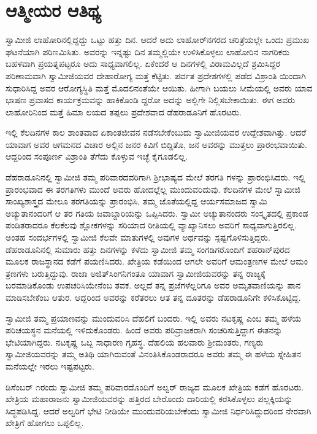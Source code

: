 
\chapter{ಆತ್ಮೀಯರ ಆತಿಥ್ಯ}

\noindent

ಸ್ವಾಮೀಜಿ ಲಾಹೋರಿನಲ್ಲಿದ್ದದ್ದು ಒಟ್ಟು ಹತ್ತು ದಿನ. ಆದರೆ ಅದು ಲಾಹೋರ್​ನಗರದ ಚರಿತ್ರೆಯಲ್ಲೇ ಒಂದು ಪ್ರಮುಖ ಘಟನೆಯಾಗಿ ಪರಿಣಮಿಸಿತು. ಅವರನ್ನು ಇನ್ನಷ್ಟು ದಿನ ತಮ್ಮಲ್ಲಿಯೇ ಉಳಿಸಿಕೊಳ್ಳಲು ಲಾಹೋರಿನ ನಾಗರಿಕರು ಬಹಳವಾಗಿ ಪ್ರಯತ್ನಪಟ್ಟರೂ ಅದು ಸಾಧ್ಯವಾಗಲಿಲ್ಲ. ಏಕೆಂದರೆ ಆ ದಿನಗಳಲ್ಲಿ ವಿರಾಮವಿಲ್ಲದೆ ಶ್ರಮಿಸಿದ್ದರ ಪರಿಣಾಮವಾಗಿ ಸ್ವಾಮೀಜಿಯವರ ದೇಹಾರೋಗ್ಯ ಮತ್ತೆ ಕೆಟ್ಟಿತು. ಪರ್ವತ ಪ್ರದೇಶಗಳಲ್ಲಿ ಪಡೆದ ವಿಶ್ರಾಂತಿ ಯಿಂದಾಗಿ ಸುಧಾರಿಸಿದ್ದ ಅವರ ಆರೋಗ್ಯಸ್ಥಿತಿ ಮತ್ತೆ ಮೊದಲಿನಂತೆಯೇ ಆಯಿತು. ಹೀಗಾಗಿ ಬಯಲು ಸೀಮೆಯಲ್ಲಿ ಅವರು ಯಾವ ಭಾಷಣ ಪ್ರವಾಸದ ಕಾರ್ಯಕ್ರಮವನ್ನು ಹಾಕಿಕೊಂಡಿ ದ್ದರೋ ಅದನ್ನು ಅಲ್ಲಿಗೇ ನಿಲ್ಲಿಸಬೇಕಾಯಿತು. ಈಗ ಅವರು ಲಾಹೋರಿನಿಂದ ಮತ್ತೆ ಹಿಮಾ ಲಯದ ತಪ್ಪಲು ಪ್ರದೇಶವಾದ ಡೆಹರಾಡೂನಿಗೆ ಹೊರಟರು.

ಇಲ್ಲಿ ಕೆಲದಿನಗಳ ಕಾಲ ಶಾಂತವಾದ ಏಕಾಂತಜೀವನ ನಡೆಸಬೇಕೆಂಬುದು ಸ್ವಾಮೀಜಿಯವರ ಉದ್ದೇಶವಾಗಿತ್ತು. ಆದರೆ ಯಾವಾಗ ಅವರ ಆಗಮನದ ವಿಚಾರ ಅಲ್ಲಿನ ಜನರ ಕಿವಿಗೆ ಬಿದ್ದಿತೊ, ಜನ ಅವರನ್ನು ಮುತ್ತಲು ಪ್ರಾರಂಭವಾಯಿತು. ಆದ್ದರಿಂದ ಸಂಪೂರ್ಣ ವಿಶ್ರಾಂತಿ ತೆಗೆದು ಕೊಳ್ಳುವ ಇಚ್ಛೆ ಕೈಗೂಡಲಿಲ್ಲ.

ಡೆಹರಾಡೂನಿನಲ್ಲಿ ಸ್ವಾಮೀಜಿ ತಮ್ಮ ಪರಿವಾರದವರಿಗಾಗಿ ಶ್ರೀಭಾಷ್ಯದ ಮೇಲೆ ತರಗತಿ ಗಳನ್ನು ಪ್ರಾರಂಭಿಸಿದರು. ಇಲ್ಲಿ ಪ್ರಾರಂಭವಾದ ಈ ತರಗತಿಗಳು ಮುಂದೆ ಅವರು ಹೋದಲ್ಲೆಲ್ಲ ಮುಂದುವರಿದುವು. ಕೆಲದಿನಗಳ ಮೇಲೆ ಸ್ವಾಮೀಜಿ ಸಾಂಖ್ಯಶಾಸ್ತ್ರದ ಮೇಲೂ ತರಗತಿಯನ್ನು ಪ್ರಾರಂಭಿಸಿ, ತಮ್ಮ ಜೊತೆಯಲ್ಲಿದ್ದ ಆರ್ಯಸಮಾಜದ ಸ್ವಾಮಿ ಅಚ್ಯುತಾನಂದರಿಗೆ ಆ ತರ ಗತಿಯ ಜವಾಬ್ದಾರಿಯನ್ನು ಒಪ್ಪಿಸಿದರು. ಸ್ವಾಮೀ ಅಚ್ಯುತಾನಂದರು ಸಂಸ್ಕೃತದಲ್ಲಿ ಪ್ರಕಾಂಡ ಪಂಡಿತರಾದರೂ ಕೆಲಕೆಲವು ಶ್ಲೋಕಗಳನ್ನು ಸರಿಯಾದ ರೀತಿಯಲ್ಲಿ ವ್ಯಾಖ್ಯಾನಿಸಲು ಅವರಿಗೆ ಸಾಧ್ಯವಾಗುತ್ತಿರಲಿಲ್ಲ. ಅಂತಹ ಸಂದರ್ಭಗಳಲ್ಲಿ ಸ್ವಾಮೀಜಿ ಕೆಲವೇ ಮಾತುಗಳಲ್ಲಿ ಅವುಗಳ ಅರ್ಥವನ್ನು ಸ್ಪಷ್ಟಗೊಳಿಸುತ್ತಿದ್ದರು. ಡೆಹರಾಡೂನಿನಲ್ಲಿ ಸುಮಾರು ಹತ್ತು ದಿನಗಳನ್ನು ಕಳೆದು ಸ್ವಾಮೀಜಿ ತಮ್ಮ ಸಂಗಡಿಗರೊಂದಿಗೆ ಶಹರಾನ್​ಪುರದ ಮೂಲಕ ರಾಜಸ್ಥಾನದ ಕಡೆಗೆ ಪಯಣಿಸಿದರು. ಖೇತ್ರಿಯ ಕಡೆಯಿಂದ ಆಗಲೇ ಅವರಿಗೆ ಆಮಂತ್ರಣಗಳ ಮೇಲೆ ಆಮಂ ತ್ರಣಗಳು ಬರುತ್ತಿದ್ದುವು. ರಾಜಾ ಅಜಿತ್​ಸಿಂಗನಿಗಂತೂ ಯಾವಾಗ ಸ್ವಾಮೀಜಿಯವರನ್ನು ತನ್ನ ರಾಜ್ಯಕ್ಕೆ ಬರಮಾಡಿಕೊಂಡು ಉಪಚರಿಸಿಯೇನೆಂಬ ತವಕ. ಅಲ್ಲದೆ ತನ್ನ ಪ್ರಜೆಗಳೆಲ್ಲರಿಗೂ ಅವರ ಅಮೃತವಾಣಿಯನ್ನು ಪಾನ ಮಾಡಿಸಬೇಕೆಂಬ ಆತುರ. ಆದ್ದರಿಂದ ಅವರನ್ನು ಕರೆತರಲು ಆತ ತನ್ನ ದೂತರನ್ನು ಡೆಹರಾಡೂನಿಗೇ ಕಳಿಸಿಕೊಟ್ಟಿದ್ದ.

ಸ್ವಾಮೀಜಿ ತಮ್ಮ ಪ್ರಯಾಣವನ್ನು ಮುಂದುವರಿಸಿ ದೆಹಲಿಗೆ ಬಂದರು. ಇಲ್ಲಿ ಅವರು ನಟಕೃಷ್ಣ ಎಂಬ ತಮ್ಮ ಹಳೆಯ ಪರಿಚಯಸ್ಥನ ಮನೆಯಲ್ಲಿ ಇಳಿದುಕೊಂಡರು. ಹಿಂದೆ ಅವರು ಪರಿವ್ರಾಜಕರಾಗಿ ಸಂಚರಿಸುತ್ತಿದ್ದಾಗ ಈತನನ್ನು ಭೇಟಿಯಾಗಿದ್ದರು. ನಟಕೃಷ್ಣ ಒಬ್ಬ ಸಾಧಾರಣ ಗೃಹಸ್ಥ. ದೆಹಲಿಯ ಹಲವಾರು ಶ್ರೀಮಂತರು, ಗಣ್ಯರು ಸ್ವಾಮೀಜಿಯವರನ್ನು ತಮ್ಮ ಅತಿಥಿ ಯಾಗಿರುವಂತೆ ವಿನಂತಿಸಿಕೊಂಡರಾದರೂ ಅವರು ತಮ್ಮ ಈ ಹಳೆಯ ಸ್ನೇಹಿತನ ಮನೆಯಲ್ಲೇ ಇರಲು ಇಷ್ಟಪಟ್ಟರು.

ಡಿಸೆಂಬರ್ ೧ರಂದು ಸ್ವಾಮೀಜಿ ತಮ್ಮ ಪರಿವಾರದೊಂದಿಗೆ ಅಲ್ವರ್ ರಾಜ್ಯದ ಮೂಲಕ ಖೇತ್ರಿಯ ಕಡೆಗೆ ಹೊರಟರು. ಖೇತ್ರಿಯ ಮಹಾರಾಜನು ಸ್ವಾಮೀಜಿಯವರನ್ನು ಹತ್ತಿರದ ಬೇರೊಂದು ದಾರಿಯಲ್ಲಿ ಕರೆಸಿಕೊಳ್ಳಲು ಪಲ್ಲಕ್ಕಿಯನ್ನು ಸಿದ್ಧಪಡಿಸಿದ್ದ. ಆದರೆ ಅಲ್ವರಿಗೆ ಭೇಟಿ ನೀಡಿಯೇ ಮುಂದುವರಿಯಬೇಕೆಂದು ಸ್ವಾಮೀಜಿ ನಿರ್ಧರಿಸಿದ್ದುದರಿಂದ ನೇರವಾಗಿ ಖೇತ್ರಿಗೆ ಹೋಗಲು ಒಪ್ಪಲಿಲ್ಲ.

